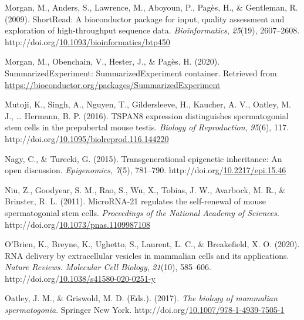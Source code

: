 \documentclass[12pt,twoside]{reedthesis}
\newlength{\cslhangindent}
\newenvironment{CSLReferences}[2] %
 {%
  \setlength{\parindent}{0pt}
  \ifodd #1 \everypar{\setlength{\hangindent}{\cslhangindent}}\ignorespaces\fi
  \ifnum #2 > 0
  \setlength{\parskip}{#2\baselineskip}
  \fi
 }%
 {}
\begin{document}
\begin{CSLReferences}{1}{0}
\leavevmode{}%
Morgan, M., Anders, S., Lawrence, M., Aboyoun, P., Pagès, H., \& Gentleman, R. (2009). ShortRead: A bioconductor package for input, quality assessment and exploration of high-throughput sequence data. \emph{Bioinformatics}, \emph{25}(19), 2607--2608. http://doi.org/\href{https://doi.org/10.1093/bioinformatics/btp450}{10.1093/bioinformatics/btp450}

\leavevmode{}%
Morgan, M., Obenchain, V., Hester, J., \& Pagès, H. (2020). SummarizedExperiment: SummarizedExperiment container. Retrieved from \url{https://bioconductor.org/packages/SummarizedExperiment}

\leavevmode{}%
Mutoji, K., Singh, A., Nguyen, T., Gildersleeve, H., Kaucher, A. V., Oatley, M. J., \ldots{} Hermann, B. P. (2016). TSPAN8 expression distinguishes spermatogonial stem cells in the prepubertal mouse testis. \emph{Biology of Reproduction}, \emph{95}(6), 117. http://doi.org/\href{https://doi.org/10.1095/biolreprod.116.144220}{10.1095/biolreprod.116.144220}

\leavevmode{}%
Nagy, C., \& Turecki, G. (2015). Transgenerational epigenetic inheritance: An open discussion. \emph{Epigenomics}, \emph{7}(5), 781--790. http://doi.org/\href{https://doi.org/10.2217/epi.15.46}{10.2217/epi.15.46}

\leavevmode{}%
Niu, Z., Goodyear, S. M., Rao, S., Wu, X., Tobias, J. W., Avarbock, M. R., \& Brinster, R. L. (2011). MicroRNA-21 regulates the self-renewal of mouse spermatogonial stem cells. \emph{Proceedings of the National Academy of Sciences}. http://doi.org/\href{https://doi.org/10.1073/pnas.1109987108}{10.1073/pnas.1109987108}

\leavevmode{}%
O'Brien, K., Breyne, K., Ughetto, S., Laurent, L. C., \& Breakefield, X. O. (2020). RNA delivery by extracellular vesicles in mammalian cells and its applications. \emph{Nature Reviews. Molecular Cell Biology}, \emph{21}(10), 585--606. http://doi.org/\href{https://doi.org/10.1038/s41580-020-0251-y}{10.1038/s41580-020-0251-y}

\leavevmode{}%
Oatley, J. M., \& Griswold, M. D. (Eds.). (2017). \emph{The biology of mammalian spermatogonia}. Springer New York. http://doi.org/\href{https://doi.org/10.1007/978-1-4939-7505-1}{10.1007/978-1-4939-7505-1}


\end{CSLReferences}
\end{document}
